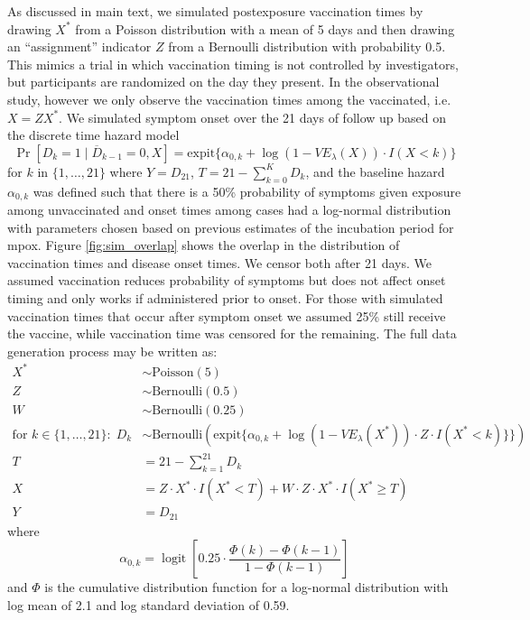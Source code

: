 \begin{appendix}
    As discussed in main text, we simulated postexposure vaccination times by drawing $X^*$ from a Poisson distribution with a mean of 5 days and then drawing an ``assignment'' indicator $Z$ from a Bernoulli distribution with probability 0.5. This mimics a trial in which vaccination timing is not controlled by investigators, but participants are randomized on the day they present. In the observational study, however we only observe the vaccination times among the vaccinated, i.e. $X = ZX^* $. We simulated symptom onset over the 21 days of follow up based on the discrete time hazard model 
    $$\Pr[D_k = 1 \mid \overline{D}_{k-1} = 0, X] =  \text{expit}\{\alpha_{0,k} + \log(1 - VE_{\lambda}(X)) \cdot I(X < k)\}$$
    for $k$ in $\{1, \ldots, 21\}$ where $Y = D_{21}$, $T = 21 - \sum_{k=0}^K D_k$, and the baseline hazard $\alpha_{0,k}$ was defined such that there is a 50\% probability of symptoms given exposure among unvaccinated and onset times among cases had a log-normal distribution with parameters chosen based on previous estimates of the incubation period for mpox. Figure \ref{fig:sim_overlap} shows the overlap in the distribution of vaccination times and disease onset times. We censor both after 21 days. We assumed vaccination reduces probability of symptoms but does not affect onset timing and only works if administered prior to onset. For those with simulated vaccination times that occur after symptom onset we assumed 25\% still receive the vaccine, while vaccination time was censored for the remaining. The full data generation process may be written as:
    \begin{align*}
        X^* & \sim \text{Poisson}(5) \\
        Z & \sim \text{Bernoulli}(0.5) \\
        W & \sim \text{Bernoulli}(0.25) \\
        \text{for } k \in \{1, \ldots, 21\}: \; D_k & \sim \text{Bernoulli}(\text{expit}\{\alpha_{0,k} + \log(1 - VE_{\lambda}(X^*)) \cdot Z \cdot I(X^* < k)\}\}) \\
        T &= 21 - \sum_{k=1}^{21} D_k \\
        X &= Z \cdot X^* \cdot I(X^* < T) + W \cdot Z \cdot X^* \cdot I(X^* \geq T) \\
        Y &= D_{21}
    \end{align*}
    where 
    $$\alpha_{0,k} = \operatorname{logit}\left[0.25 \cdot \frac{\Phi(k) - \Phi(k -1)}{1 - \Phi(k-1)}\right]$$
    and $\Phi$ is the cumulative distribution function for a log-normal distribution with log mean of 2.1 and log standard deviation of 0.59.


\end{appendix}
